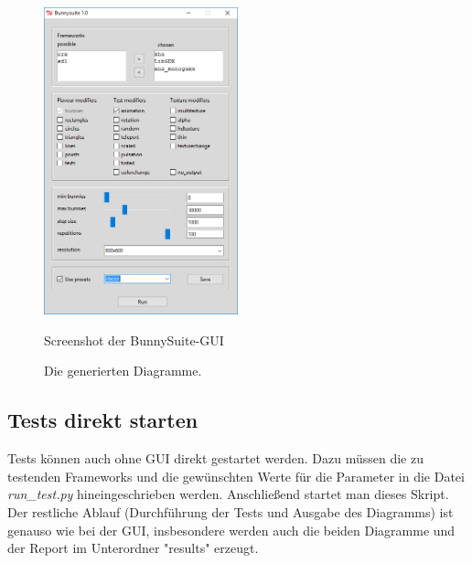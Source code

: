 \begin{figure}
\caption{Screenshot der BunnySuite-GUI}
\centering
\includegraphics[width=0.5\textwidth]{gui}
\label{dia:gui}
\end{figure}

\begin{figure}[!tbp]
  \centering
  \hfill
  \caption{Die generierten Diagramme.}
\end{figure}

\subsection{Tests direkt starten}
Tests können auch ohne GUI direkt gestartet werden. Dazu müssen die zu testenden Frameworks und die gewünschten Werte für die Parameter in die Datei \textit{run\_test.py} hineingeschrieben werden. Anschließend startet man dieses Skript. Der restliche Ablauf (Durchführung der Tests und Ausgabe des Diagramms) ist genauso wie bei der GUI, insbesondere werden auch die beiden Diagramme und der Report im Unterordner "results" erzeugt.

